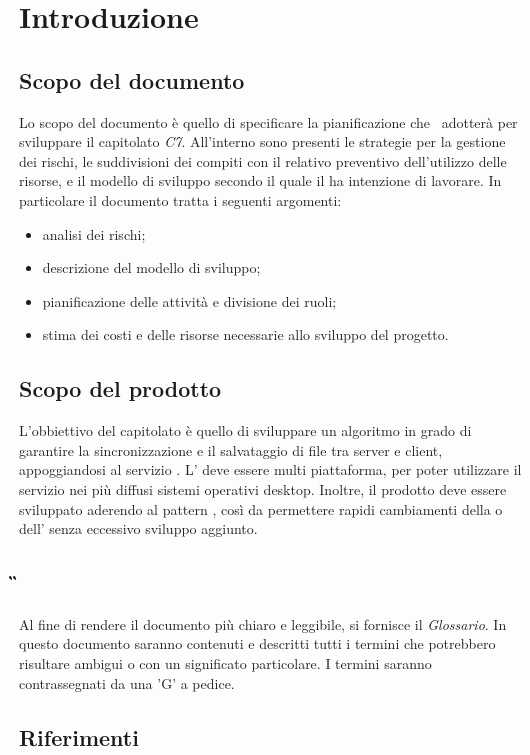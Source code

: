 \section{Introduzione}
\subsection{Scopo del documento}
Lo scopo del documento è quello di specificare la pianificazione che \Gruppo \, adotterà per sviluppare il capitolato \textit{C7}. All'interno sono presenti le strategie per la gestione dei rischi, le suddivisioni dei compiti con il relativo preventivo dell'utilizzo delle risorse, e il modello di sviluppo secondo il quale il  ha intenzione di lavorare.
In particolare il documento tratta i seguenti argomenti:
\begin{itemize}
\item analisi dei rischi;
\item descrizione del modello di sviluppo;
\item pianificazione delle attività e divisione dei ruoli;
\item stima dei costi e delle risorse necessarie allo sviluppo del progetto.
\end{itemize}
\subsection{Scopo del prodotto}
L'obbiettivo del capitolato è quello di sviluppare un algoritmo in grado di garantire la sincronizzazione e il salvataggio di file tra server e client, appoggiandosi al servizio \textit{}.
L' deve essere multi piattaforma, per poter utilizzare il servizio nei più diffusi sistemi operativi desktop.
Inoltre, il prodotto deve essere sviluppato aderendo al pattern , così da permettere rapidi cambiamenti della  o dell' senza eccessivo sviluppo aggiunto.
\subsection{\G{}}
Al fine di rendere il documento più chiaro e leggibile, si fornisce il \textit{Glossario}. In questo documento saranno contenuti e descritti tutti i termini che potrebbero risultare ambigui o con un significato particolare. I termini saranno contrassegnati da una 'G' a pedice.
\subsection{Riferimenti}

